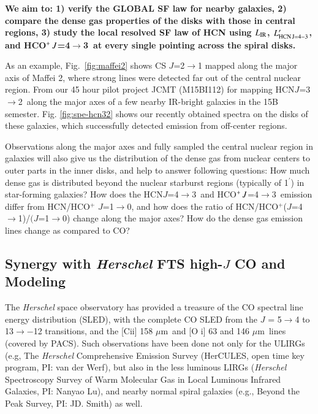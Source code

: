 \documentclass[legal,11pt]{article}
\def\arcmin {\hbox{$^{\prime}$}}
\def\,{\thinspace}
\def\to{$\rightarrow$}
\def\mum{$\mu$m}
\def\LIR     {$L_{\rm IR}$}
\def\LHCNft  {$L'_{\rm HCN\, J=4-3}$}
\def\HCNft        {HCN\,$J$=4$\rightarrow$3}
\def\HCNtt        {HCN\,$J$=3$\rightarrow$2}
\def\HCOPft     {HCO$^+\,J$=4$\rightarrow$3}
\begin{document}
{\bf We aim to: 1) verify the GLOBAL SF law for nearby galaxies, 2) compare the
dense gas properties of the disks with those in central regions, 3) study the
local resolved SF law of HCN using \LIR, \LHCNft, and \HCOPft\  at every single
pointing across the spiral disks.} 


As an example, Fig.~\ref{fig:maffei2} shows CS $J$=2$\rightarrow$1 mapped along
the major axis of Maffei 2, where strong lines were detected far out of the
central nuclear region. From our 45 hour pilot project JCMT (M15BI112) for
mapping \HCNtt\ along the major axes of a few nearby IR-bright galaxies in the
15B semester. Fig. \ref{fig:spe-hcn32} shows our recently obtained spectra on
the disks of these galaxies, which successfully detected emission from
off-center regions.  


Observations along the major axes and fully sampled the central nuclear region
in galaxies will also give us the distribution of the dense gas from nuclear
centers to outer parts in the inner disks, and help to answer following
questions: How much dense gas is distributed beyond the nuclear starburst
regions (typically of 1\arcmin) in star-forming galaxies?  How does the \HCNft\
and \HCOPft\ emission differ from HCN/HCO$^+$ $J$=1\to0, and how does the ratio
of HCN/HCO$^+$($J$=4\to 1)/$(J$=1\to 0) change along the major axes? How do the
dense gas emission lines change as compared to CO?


\subsection{Synergy with \textit{\textbf{Herschel}} FTS high-$J$ CO and Modeling}

The {\it Herschel} space observatory has provided a treasure of the CO spectral line
energy distribution (SLED),  with the complete CO SLED from the $J$ = 5\to4 to
13\to−12 transitions, and the [C{\sc ii}] 158 \mum\ and [O {\sc i}] 63 and 146
\mum\ lines (covered by PACS). Such observations have been done not only for
the ULIRGs (e.g, The {\it Herschel} Comprehensive Emission Survey (HerCULES, open
time key program, PI: van der Werf), but also in the less luminous LIRGs
({\it Herschel} Spectroscopy  Survey of Warm Molecular Gas in Local Luminous Infrared
Galaxies, PI: Nanyao Lu), and nearby normal spiral galaxies (e.g., Beyond the
Peak Survey, PI: JD. Smith) as well.  
\end{document}

